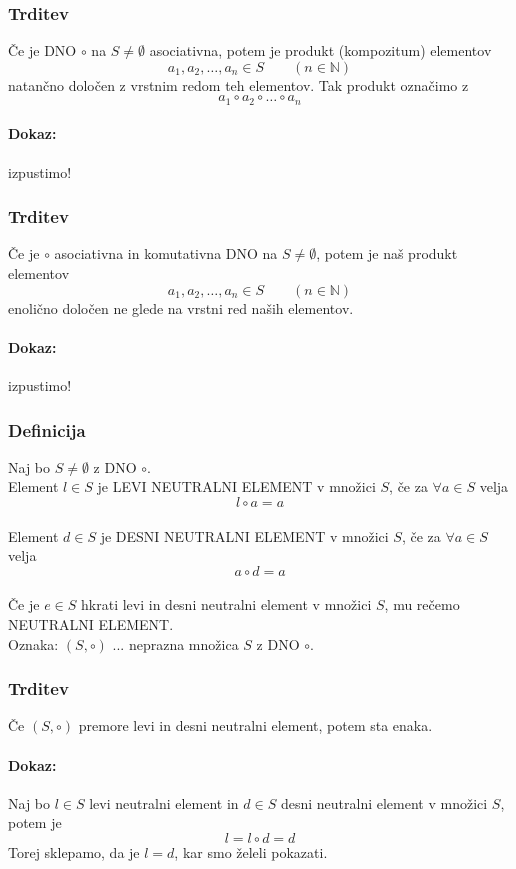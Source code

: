 \subsubsection{Trditev}
Če je DNO $\circ$ na $S \ne \emptyset$ asociativna, potem je produkt (kompozitum) elementov 
$$a_1, a_2, \dots, a_n \in S \text{ } \text{ } \text{ } (n \in \mathbb{N})$$ 
natančno določen z vrstnim redom teh elementov. Tak produkt označimo z
$$a_1 \circ a_2 \circ \dots \circ a_n$$

\paragraph{Dokaz:}
izpustimo!

\subsubsection{Trditev}
Če je $\circ$ asociativna in komutativna DNO na $S \ne \emptyset$, potem je naš produkt elementov
$$a_1, a_2, \dots, a_n \in S \text{ } \text{ } \text{ } (n \in \mathbb{N})$$
enolično določen ne glede na vrstni red naših elementov.

\paragraph{Dokaz:}
izpustimo!

\subsubsection{Definicija}
Naj bo $S \ne \emptyset$ z DNO $\circ$. \\[1em]
Element $l \in S$ je LEVI NEUTRALNI ELEMENT v množici $S$, če za $\forall a \in S$ velja
$$l \circ a = a$$ \\[1em]
Element $d \in S$ je DESNI NEUTRALNI ELEMENT v množici $S$, če za $\forall a \in S$ velja
$$a \circ d = a$$ \\[1em]
Če je $e \in S$ hkrati levi in desni neutralni element v množici $S$, mu rečemo NEUTRALNI ELEMENT. \\[1em]
Oznaka: $(S, \circ)$ ... neprazna množica $S$ z DNO $\circ$.

\subsubsection{Trditev}
Če $(S, \circ)$ premore levi in desni neutralni element, potem sta enaka.

\paragraph{Dokaz:}
Naj bo $l \in S$ levi neutralni element in $d \in S$ desni neutralni element v množici $S$, potem je
$$l = l \circ d = d$$
Torej sklepamo, da je $l = d$, kar smo želeli pokazati.

